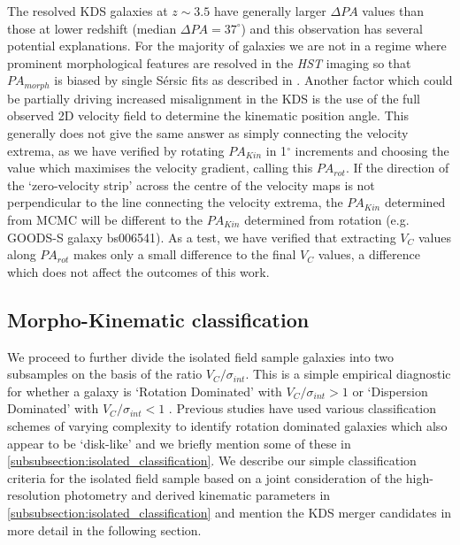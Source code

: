 \documentclass[fleqn,usenatbib]{mn2e}
\newcommand{\Sers}{S\'{e}rsic }
\begin{document}
The resolved KDS galaxies at $z \sim 3.5$ have generally larger $\Delta PA$ values than those at lower redshift (median $\Delta PA = 37^{\circ}$) and this observation has several potential explanations.
For the majority of galaxies we are not in a regime where prominent morphological features are resolved in the {\em HST} imaging so that $PA_{morph}$ is biased by single \Sers fits as described in \cite{Rodrigues2016}.
Another factor which could be partially driving increased misalignment in the KDS is the use of the full observed 2D velocity field to determine the kinematic position angle.
This generally does not give the same answer as simply connecting the velocity extrema, as we have verified by rotating $PA_{Kin}$ in 1$^{\circ}$ increments and choosing the value which maximises the velocity gradient, calling this $PA_{rot}$.
If the direction of the `zero-velocity strip' across the centre of the velocity maps is not perpendicular to the line connecting the velocity extrema, the $PA_{Kin}$ determined from MCMC will be different to the $PA_{Kin}$ determined from rotation (e.g. GOODS-S galaxy bs006541).
As a test, we have verified that extracting $V_{C}$ values along $PA_{rot}$ makes only a small difference to the final $V_{C}$ values, a difference which does not affect the outcomes of this work.


\subsection{Morpho-Kinematic classification}\label{subsec:morpho-kin-class}
We proceed to further divide the isolated field sample galaxies into two subsamples on the basis of the ratio $V_{C}/\sigma_{int}$.
This is a simple empirical diagnostic for whether a galaxy is `Rotation Dominated' with $V_{C}/\sigma_{int} > 1$ or `Dispersion Dominated' with $V_{C}/\sigma_{int} < 1$  \citep[i.e. a method to measure the prevalence of rotational and random motions;][]{Epinat2012,Wisnioski2015,Stott2016,Harrison2017}.
Previous studies have used various classification schemes of varying complexity to identify rotation dominated galaxies which also appear to be `disk-like' and we briefly mention some of these in \cref{subsubsection:isolated_classification}.
We describe our simple classification criteria for the isolated field sample based on a joint consideration of the high-resolution photometry and derived kinematic parameters in \cref{subsubsection:isolated_classification} and mention the KDS merger candidates in more detail in the following section.
\end{document}
